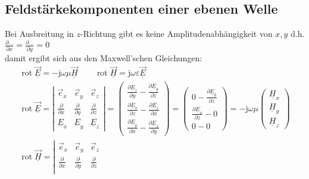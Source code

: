 \subsection{Feldstärkekomponenten einer ebenen Welle}
Bei Ausbreitung in $z$-Richtung gibt es keine Amplitudenabhängigkeit von $x, y$ d.h. $\frac{\partial \ldots}{\partial x}=\frac{\partial \ldots}{\partial y}=0$ \\damit ergibt sich aus den Maxwell'schen Gleichungen:
{\footnotesize
	$$
	\begin{gathered}
		\boxed{\operatorname{rot} \underline{\vec{E}}=-\mathrm{j} \omega \mu \underline{\vec{H}}} \qquad \boxed{\operatorname{rot} \underline{\vec{H}}=\mathrm{j} \omega \varepsilon \underline{\vec{E}}} \\
		\operatorname{rot} \underline{\vec{E}}=\left|\begin{array}{ccc}
			\vec{e}_x & \vec{e}_y & \vec{e}_z \\
			\frac{\partial}{\partial x} & \frac{\partial}{\partial y} & \frac{\partial}{\partial z} \\
			\underline{E}_x & \underline{E}_y & \underline{E}_z
		\end{array}\right|=\left(\begin{array}{c}
			\frac{\partial \underline{E}_z}{\partial y}-\frac{\partial \underline{E}_y}{\partial z} \\
			\frac{\partial \underline{E}_x}{\partial z}-\frac{\partial \underline{E}_z}{\partial x} \\
			\frac{\partial \underline{E}_y}{\partial x}-\frac{\partial \underline{E}_x}{\partial y}
		\end{array}\right)=\left(\begin{array}{l}
			0-\frac{\partial \underline{E}_y}{\partial z} \\
			\frac{\partial \underline{E}_x}{\partial z}-0 \\
			0-0
		\end{array}\right)=-\mathrm{j} \omega \mu\left(\begin{array}{l}
			\underline{H}_x \\
			\underline{H}_y \\
			\underline{H}_z
		\end{array}\right) \\
		\operatorname{rot} \underline{\vec{H}}=\left|\begin{array}{ccc}
			\vec{e}_x & \vec{e}_y & \vec{e}_z \\
			\frac{\partial}{\partial x} & \frac{\partial}{\partial y} & \frac{\partial}{\partial z} \\

\end{array}
\end{gathered}$$}
